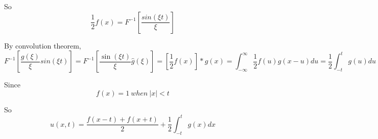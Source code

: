 \documentclass{article}
\begin{document}
So$$\frac{1}{2}f\left(x\right)=F^{-1}[\frac{sin(\xi{}t)}{\xi{}}]$$

By convolution theorem,
$$F^{-1}\left[\frac{\hat{g}\left(\xi{}\right)}{\xi{}}sin\left(\xi{}t\right)\right]=F^{-1}\left[\frac{\sin{\left(\xi{}t\right)}}{\xi{}}\hat{g}\left(\xi{}\right)\right]=\left[\frac{1}{2}f\left(x\right)\right]*g\left(x\right)=\int_{-\infty{}}^{\infty{}}\frac{1}{2}f\left(u\right)g\left(x-u\right)du=\frac{1}{2}\int_{-t}^tg\left(u\right)du$$

Since$$ f\left(x\right)=1\ when\ \left\vert{}x\right\vert{}<t$$

So
$$u\left(x,t\right)=\frac{f\left(x-t\right)+f\left(x+t\right)}{2}+\frac{1}{2}\int_{-t}^tg\left(x\right)dx$$
\end{document}
